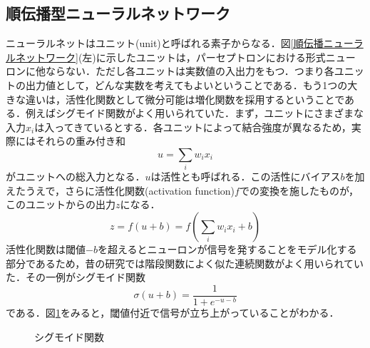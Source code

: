 \documentclass[a4paper,11pt]{jsreport}
\begin{document}
\subsection{順伝播型ニューラルネットワーク}
ニューラルネットはユニット(unit)と呼ばれる素子からなる．図\ref{順伝播ニューラルネットワーク}(左)に示したユニットは，パーセプトロンにおける形式ニューロンに他ならない．ただし各ユニットは実数値の入出力をもつ．つまり各ユニットの出力値として，どんな実数を考えてもよいということである．もう1つの大きな違いは，活性化関数として微分可能は増化関数を採用するということである．例えばシグモイド関数がよく用いられていた．まず，ユニットにさまざまな入力$x_i$は入ってきているとする．各ユニットによって結合強度が異なるため，実際にはそれらの重み付き和
\begin{equation}
  u = \sum_{i} w_i x_i
\end{equation}
がユニットへの総入力となる．$u$は活性とも呼ばれる．この活性にバイアス$b$を加えたうえで，さらに活性化関数(activation function)$f$での変換を施したものが，このユニットからの出力$z$になる．
\begin{equation}
  z = f(u + b) = f\left( \sum_{i} w_i x_i + b \right)
\end{equation}
活性化関数は閾値$-b$を超えるとニューロンが信号を発することをモデル化する部分であるため，昔の研究では階段関数によく似た連続関数がよく用いられていた．その一例がシグモイド関数
\begin{equation}
  \sigma(u + b) = \frac{1}{1 + e^{-u-b}}
\end{equation}
である．図\ref{シグモイド関数}をみると，閾値付近で信号が立ち上がっていることがわかる．
\begin{figure}
  \begin{center}
    \centering
    \caption{シグモイド関数}
    \label{シグモイド関数}
  \end{center}
\end{figure}
\end{document}
